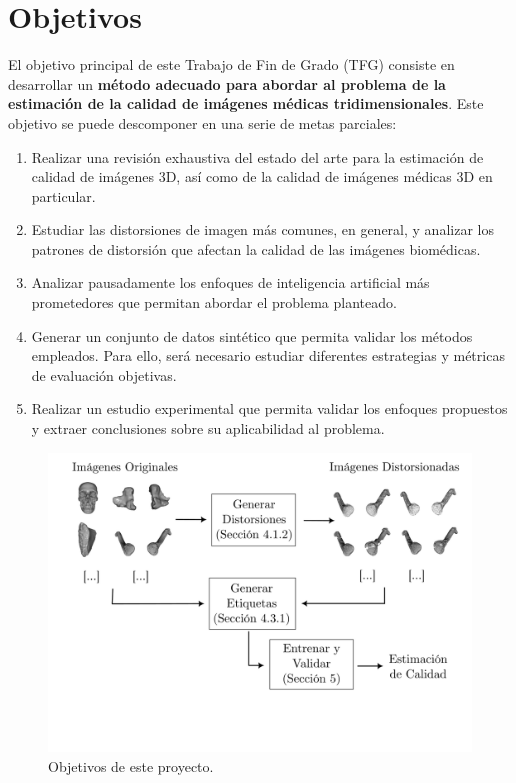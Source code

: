 \section{Objetivos}
El objetivo principal de este Trabajo de Fin de Grado (TFG) 
consiste en desarrollar un \textbf{método adecuado para abordar al 
problema de la estimación de la calidad de imágenes médicas tridimensionales}. 
Este objetivo se puede descomponer en una serie de metas parciales: 
\begin{enumerate}
  \item Realizar una revisión exhaustiva del estado del arte para la estimación de calidad 
    de imágenes 3D, así como de la calidad de imágenes médicas 3D en particular.
  \item Estudiar las distorsiones de imagen más comunes, en general, y analizar los patrones de distorsión que afectan la calidad de las imágenes 
    biomédicas.
  \item Analizar pausadamente los enfoques de inteligencia artificial más prometedores que permitan abordar el problema planteado. 
  \item Generar un conjunto de datos sintético que permita validar 
    los métodos empleados. Para ello, será necesario estudiar diferentes 
    estrategias y métricas de evaluación objetivas.
  \item Realizar un estudio experimental que permita validar los enfoques 
    propuestos y extraer conclusiones sobre su aplicabilidad al problema. 
\end{enumerate}

\begin{figure}
  \begin{center}
    \includegraphics[width=\textwidth]{imagenes/chapter1/Objetivos}
  \end{center}
  \caption{Objetivos de este proyecto.}
  \label{fig:Objetivos}
\end{figure}


